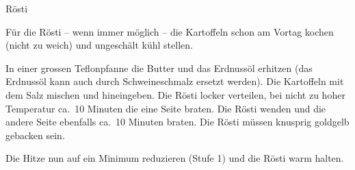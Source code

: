 \begin{recipe}[\vegetarian]{Rösti}
    \label{rosti}

    \begin{ingredients}
    \end{ingredients}

    \begin{instructions}
        Für die Rösti -- wenn immer möglich -- die Kartoffeln schon am Vortag kochen (nicht zu weich) und ungeschält kühl stellen.

        In einer grossen Teflonpfanne die Butter und das Erdnussöl erhitzen (das Erdnussöl kann auch durch Schweineschmalz ersetzt werden).
        Die Kartoffeln mit dem Salz mischen und hineingeben.
        Die Rösti locker verteilen, bei nicht zu hoher Temperatur ca.\ 10 Minuten die eine Seite braten. Die Rösti wenden und die andere Seite ebenfalls ca.\ 10 Minuten braten.
        Die Rösti müssen knusprig goldgelb gebacken sein.

        Die Hitze nun auf ein Minimum reduzieren (Stufe 1) und die Rösti warm halten.
    \end{instructions}
\end{recipe}
